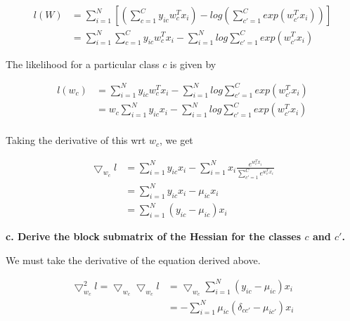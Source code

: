 {\begin{align}
    l(W) & = \sum_{i=1}^N \left [ \left ( \sum_{c=1}^C y_{ic}w_c^Tx_i \right )
             - log \left ( \sum_{c'=1}^C exp(w_{c'}^Tx_i) \right ) \right ] \\
    & = \sum_{i=1}^N \sum_{c=1}^C y_{ic}w_c^Tx_i
      - \sum_{i=1}^N log \sum_{c'=1}^C exp(w_{c'}^Tx_i)
\end{align}

The likelihood for a particular class $c$ is given by

\begin{align}
    l(w_c) & = \sum_{i=1}^N y_{ic}w_c^Tx_i
             - \sum_{i=1}^N log \sum_{c'=1}^C exp(w_{c'}^Tx_i) \\
    & = w_c\sum_{i=1}^N y_{ic}x_i
      - \sum_{i=1}^N log \sum_{c'=1}^C exp(w_{c'}^Tx_i) \\
\end{align}

Taking the derivative of this wrt $w_c$, we get

\begin{align}
    \bigtriangledown_{w_c} l & = \sum_{i=1}^N y_{ic}x_i
    - \sum_{i=1}^N x_i\frac{e^{w_c^Tx_i}}{\sum_{c'=1}^C e^{w_{c'}^Tx_i}} \\
    & = \sum_{i=1}^N y_{ic}x_i - \mu_{ic}x_i \\
    & = \sum_{i=1}^N (y_{ic} - \mu_{ic})x_i
\end{align}

\textbf{c. Derive the block submatrix of the Hessian for the classes
$c$ and $c'$.}

We must take the derivative of the equation derived above.

\begin{align}
    \bigtriangledown_{w_c}^2 l = \bigtriangledown_{w_c} \bigtriangledown_{w_c} l
    & = \bigtriangledown_{w_c} \sum_{i=1}^N (y_{ic} - \mu_{ic})x_i \\
    & = -\sum_{i=1}^N \mu_{ic}(\delta_{cc'} - \mu_{ic'})x_i
\end{align}

}

